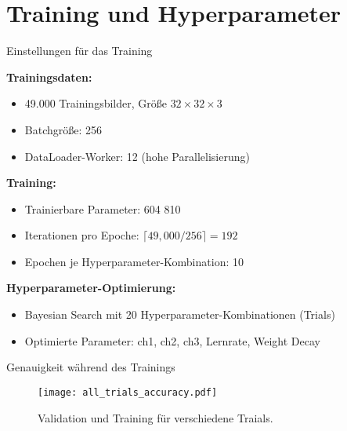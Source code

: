 \section{Training und Hyperparameter}

\begin{frame}{Einstellungen für das Training}

\textbf{Trainingsdaten:}
\begin{itemize}
    \item 49.000 Trainingsbilder, Größe $32 \times 32 \times 3$
    \item Batchgröße: 256
    \item DataLoader-Worker: 12 (hohe Parallelisierung)
\end{itemize}

\textbf{Training:}
\begin{itemize}
    \item Trainierbare Parameter: 604 810
    \item Iterationen pro Epoche: $\lceil 49{,}000 / 256 \rceil = 192$
    \item Epochen je Hyperparameter-Kombination: 10
\end{itemize}

\textbf{Hyperparameter-Optimierung:}
\begin{itemize}
    \item \alert{Bayesian Search} mit 20 Hyperparameter-Kombinationen (Trials)
    \item Optimierte Parameter: ch1, ch2, ch3, Lernrate, Weight Decay
\end{itemize}
\end{frame}

\begin{frame}{Genauigkeit während des Trainings}
\begin{figure}
    \centering
    \texttt{[image: all\_trials\_accuracy.pdf]}
    \caption{Validation und Training für verschiedene Traials.}
\end{figure}
\end{frame}

